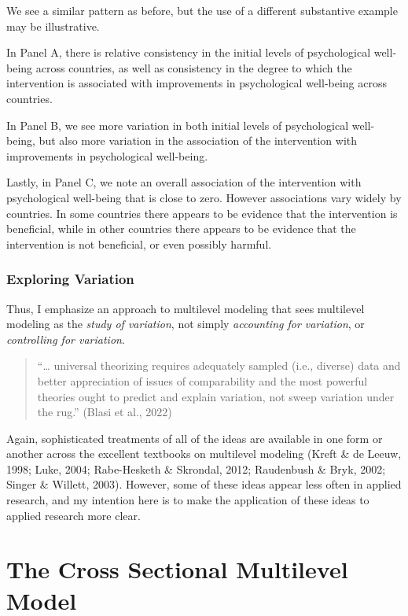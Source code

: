 \documentclass[
  letterpaper,
  DIV=11,
  numbers=noendperiod]{scrreprt}
\begin{document}
We see a similar pattern as before, but the use of a different
substantive example may be illustrative.

In Panel A, there is relative consistency in the initial levels of
psychological well-being across countries, as well as consistency in the
degree to which the intervention is associated with improvements in
psychological well-being across countries.

In Panel B, we see more variation in both initial levels of
psychological well-being, but also more variation in the association of
the intervention with improvements in psychological well-being.

Lastly, in Panel C, we note an overall association of the intervention
with psychological well-being that is close to zero. However
associations vary widely by countries. In some countries there appears
to be evidence that the intervention is beneficial, while in other
countries there appears to be evidence that the intervention is not
beneficial, or even possibly harmful.

\hypertarget{exploring-variation}{%
\subsection{Exploring Variation}\label{exploring-variation}}

Thus, I emphasize an approach to multilevel modeling that sees
multilevel modeling as the \emph{study of variation}, not simply
\emph{accounting for variation}, or \emph{controlling for variation}.

\begin{quote}
``\ldots{} universal theorizing requires adequately sampled (i.e.,
diverse) data and better appreciation of issues of comparability and the
most powerful theories ought to predict and explain variation, not sweep
variation under the rug.'' (Blasi et al., 2022)
\end{quote}

Again, sophisticated treatments of all of the ideas are available in one
form or another across the excellent textbooks on multilevel modeling
(Kreft \& de Leeuw, 1998; Luke, 2004; Rabe-Hesketh \& Skrondal, 2012;
Raudenbush \& Bryk, 2002; Singer \& Willett, 2003). However, some of
these ideas appear less often in applied research, and my intention here
is to make the application of these ideas to applied research more
clear.


\hypertarget{the-cross-sectional-multilevel-model}{%
\chapter{The Cross Sectional Multilevel
Model}\label{the-cross-sectional-multilevel-model}}
\end{document}
